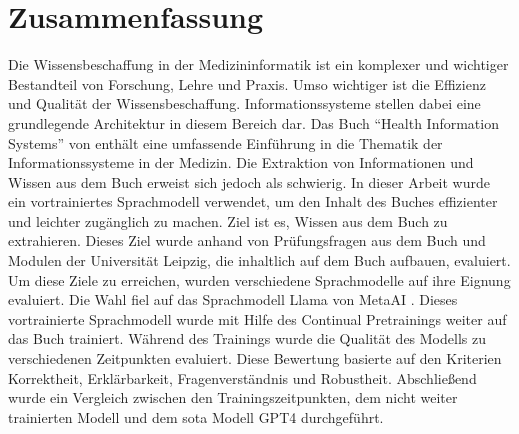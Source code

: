 \chapter*{Zusammenfassung}
%

Die Wissensbeschaffung in der Medizininformatik ist ein komplexer und wichtiger Bestandteil von Forschung, Lehre und Praxis.
Umso wichtiger ist die Effizienz und Qualität der Wissensbeschaffung.
Informationssysteme stellen dabei eine grundlegende Architektur in diesem Bereich dar.
Das Buch \enquote{Health Information Systems} von \citet{bb} enthält eine umfassende Einführung in die Thematik der Informationssysteme in der Medizin.
Die Extraktion von Informationen und Wissen aus dem Buch erweist sich jedoch als schwierig.
In dieser Arbeit wurde ein vortrainiertes Sprachmodell verwendet, um den Inhalt des Buches effizienter und leichter zugänglich zu machen.
Ziel ist es, Wissen aus dem Buch zu extrahieren.
Dieses Ziel wurde anhand von Prüfungsfragen aus dem Buch und Modulen der Universität Leipzig, die inhaltlich auf dem Buch aufbauen, evaluiert.\\

Um diese Ziele zu erreichen, wurden verschiedene Sprachmodelle auf ihre Eignung evaluiert.
Die Wahl fiel auf das Sprachmodell Llama von MetaAI \citep{llama2}.
Dieses vortrainierte Sprachmodell wurde mit Hilfe des Continual Pretrainings weiter auf das Buch trainiert.
Während des Trainings wurde die Qualität des Modells zu verschiedenen Zeitpunkten evaluiert.
Diese Bewertung basierte auf den Kriterien Korrektheit, Erklärbarkeit, Fragenverständnis und Robustheit.
Abschließend wurde ein Vergleich zwischen den Trainingszeitpunkten, dem nicht weiter trainierten Modell und dem \ac{sota} Modell GPT4 durchgeführt.\\

